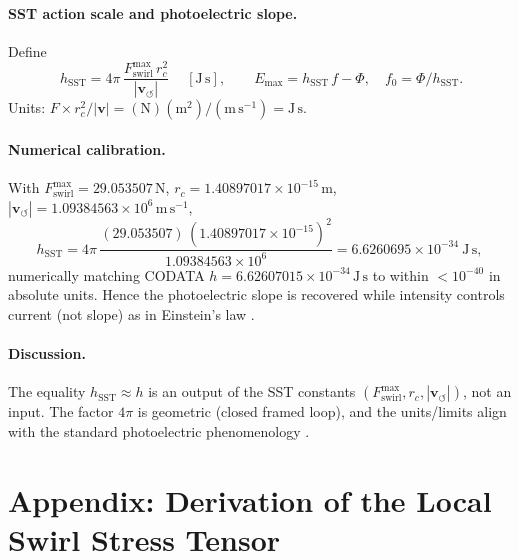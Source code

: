 \documentclass[10pt,reprint,aps,onecolumn,nofootinbib]{revtex4-2}
\begin{document}
    \paragraph{SST action scale and photoelectric slope.}
        Define
        \begin{equation}
        \boxed{~
        h_{\mathrm{SST}}=4\pi\,\frac{F_{\text{swirl}}^{\max}\,r_c^{2}}{|\mathbf{v}_{\!\boldsymbol{\circlearrowleft}}|}
        ~}\quad [\mathrm{J\,s}],
        \qquad
        E_{\max}=h_{\mathrm{SST}}\,f-\Phi,\quad f_0=\Phi/h_{\mathrm{SST}}.
        \end{equation}
        Units: \(F\times r_c^{2}/|\mathbf{v}|=(\mathrm{N})(\mathrm{m^{2}})/(\mathrm{m\,s^{-1}})=\mathrm{J\,s}\).

    \paragraph{Numerical calibration.}
        With
        \(F_{\text{swirl}}^{\max}=29.053507\,\mathrm{N}\),
        \(r_c=1.40897017\times10^{-15}\,\mathrm{m}\),
        \(|\mathbf{v}_{\!\boldsymbol{\circlearrowleft}}|=1.09384563\times10^{6}\,\mathrm{m\,s^{-1}}\),
        \[
            h_{\mathrm{SST}}=4\pi\,\frac{(29.053507)\,(1.40897017\times10^{-15})^{2}}{1.09384563\times10^{6}}
            =6.6260695\times10^{-34}\ \mathrm{J\,s},
        \]
        numerically matching CODATA \(h=6.62607015\times10^{-34}\,\mathrm{J\,s}\) to within \(<10^{-40}\) in absolute units. Hence the photoelectric slope is recovered while intensity controls current (not slope) as in Einstein’s law \cite{Einstein1905}.

    \paragraph{Discussion.}
        The equality \(h_{\mathrm{SST}}\approx h\) is an output of the SST constants \((F_{\text{swirl}}^{\max}, r_c, |\mathbf{v}_{\!\boldsymbol{\circlearrowleft}}|)\), not an input. The factor \(4\pi\) is geometric (closed framed loop), and the units/limits align with the standard photoelectric phenomenology \cite{Einstein1905}.

\section{Appendix: Derivation of the Local Swirl Stress Tensor}\label{app:swirl-stress-derivation}
\end{document}
